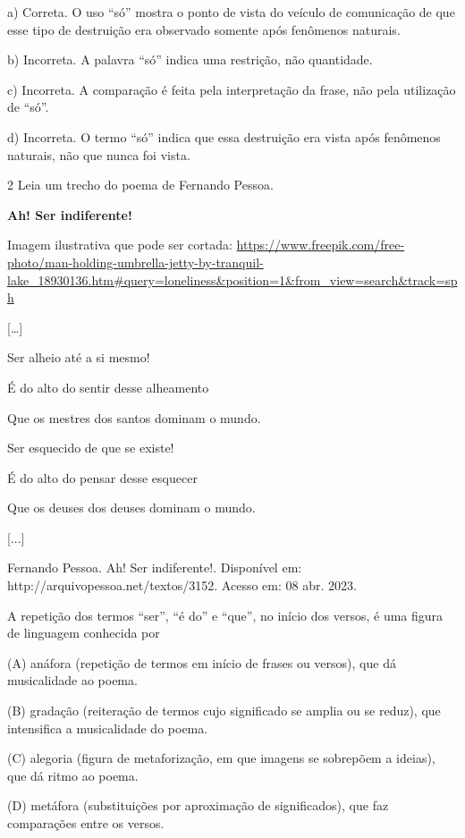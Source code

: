 \begin{itemize}
\begin{itemize}

a) Correta. O uso ``só'' mostra o ponto de vista do veículo de
comunicação de que esse tipo de destruição era observado somente após
fenômenos naturais.

b) Incorreta. A palavra ``só'' indica uma restrição, não quantidade.

c) Incorreta. A comparação é feita pela interpretação da frase, não pela
utilização de ``só''.

d) Incorreta. O termo ``só'' indica que essa destruição era vista após
fenômenos naturais, não que nunca foi vista.

\num{2} Leia um trecho do poema de Fernando Pessoa.

\textbf{Ah! Ser indiferente!}

Imagem ilustrativa que pode ser cortada:
\url{https://www.freepik.com/free-photo/man-holding-umbrella-jetty-by-tranquil-lake_18930136.htm\#query=loneliness\&position=1\&from_view=search\&track=sph}

{[}\ldots{}{]}

Ser alheio até a si mesmo!

É do alto do sentir desse alheamento

Que os mestres dos santos dominam o mundo.

Ser esquecido de que se existe!

É do alto do pensar desse esquecer

Que os deuses dos deuses dominam o mundo.

{[}...{]}

Fernando Pessoa. Ah! Ser indiferente!. Disponível em:
http://arquivopessoa.net/textos/3152. Acesso em: 08 abr. 2023.

A repetição dos termos ``ser'', ``é do'' e ``que'', no início dos
versos, é uma figura de linguagem conhecida por

(A) anáfora (repetição de termos em início de frases ou versos), que dá
musicalidade ao poema.

(B) gradação (reiteração de termos cujo significado se amplia ou se
reduz), que intensifica a musicalidade do poema.

(C) alegoria (figura de metaforização, em que imagens se sobrepõem a
ideias), que dá ritmo ao poema.

(D) metáfora (substituições por aproximação de significados), que faz
comparações entre os versos.


\end{itemize}
\end{itemize}
